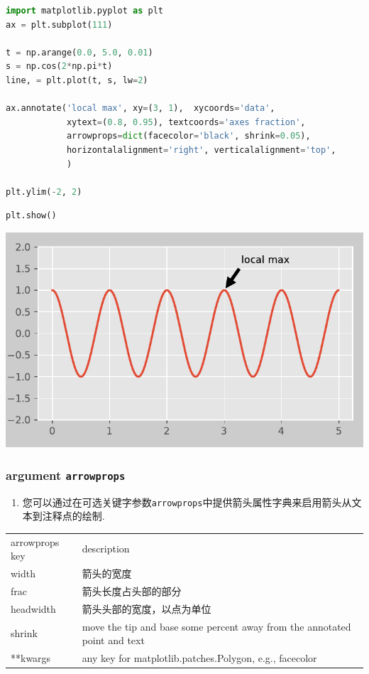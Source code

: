 \documentclass[UTF8,a4paper,12pt]{ctexart}  %
\providecommand{\tightlist}{\setlength{\itemsep}{0pt}\setlength{\parskip}{0pt}}
\newcommand{\passthrough}[1]{\lstset{mathescape=false}#1\lstset{mathescape=true}}
\begin{document}
\begin{lstlisting}[language=Python]
import matplotlib.pyplot as plt
ax = plt.subplot(111)

t = np.arange(0.0, 5.0, 0.01)
s = np.cos(2*np.pi*t)
line, = plt.plot(t, s, lw=2)

ax.annotate('local max', xy=(3, 1),  xycoords='data',
            xytext=(0.8, 0.95), textcoords='axes fraction',
            arrowprops=dict(facecolor='black', shrink=0.05),
            horizontalalignment='right', verticalalignment='top',
            )

plt.ylim(-2, 2)
\end{lstlisting}

\begin{lstlisting}[language=Python]
plt.show()
\end{lstlisting}

\begin{center}\includegraphics[width=0.9\linewidth]{python-visualization_files/figure-latex/unnamed-chunk-52-1} \end{center}

\hypertarget{argument-arrowprops}{%
\subsubsection{\texorpdfstring{argument \texttt{arrowprops}}{argument arrowprops}}\label{argument-arrowprops}}

\begin{enumerate}
\def\labelenumi{\arabic{enumi}.}
\tightlist
\item
  您可以通过在可选关键字参数\passthrough{\lstinline!arrowprops!}中提供箭头属性字典来启用箭头从文本到注释点的绘制.
\end{enumerate}

\begin{longtable}[]{@{}ll@{}}
\toprule
\endhead
arrowprops key & description\tabularnewline
width & 箭头的宽度\tabularnewline
frac & 箭头长度占头部的部分\tabularnewline
headwidth & 箭头头部的宽度，以点为单位\tabularnewline
shrink & move the tip and base some percent away from the annotated point and text\tabularnewline
**kwargs & any key for matplotlib.patches.Polygon, e.g., facecolor\tabularnewline
\bottomrule
\end{longtable}
\end{document}
